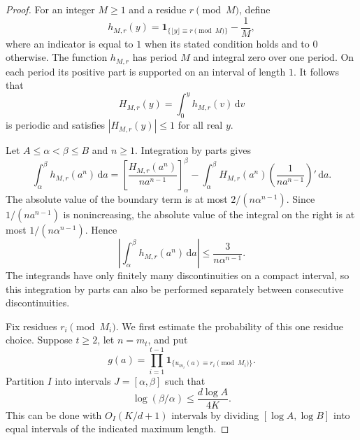 \documentclass[11pt,reqno]{amsart}
\numberwithin{equation}{section}
\begin{document}
\begin{proof}
For an integer $M\ge1$ and a residue $r\pmod M$, define
\[
 h_{M,r}(y)=\mathbf1_{\{\lfloor y\rfloor\equiv r\pmod M\}}-\frac1M,
\]
where an indicator is equal to $1$ when its stated condition holds and to $0$ otherwise. The function $h_{M,r}$ has period $M$ and integral zero over one period. On each period its positive part is supported on an interval of length $1$. It follows that
\[
 H_{M,r}(y)=\int_0^y h_{M,r}(v)\,\mathrm{d}v
\]
is periodic and satisfies $|H_{M,r}(y)|\le1$ for all real $y$.

Let $A\le \alpha<\beta\le B$ and $n\ge1$. Integration by parts gives
\[
 \int_\alpha^\beta h_{M,r}(a^n)\,\mathrm{d}a
 =\left[\frac{H_{M,r}(a^n)}{na^{n-1}}\right]_\alpha^\beta
  -\int_\alpha^\beta H_{M,r}(a^n)
       \left(\frac1{na^{n-1}}\right)'\,\mathrm{d}a.
\]
The absolute value of the boundary term is at most $2/(n\alpha^{n-1})$. Since $1/(na^{n-1})$ is nonincreasing, the absolute value of the integral on the right is at most $1/(n\alpha^{n-1})$. Hence
\begin{equation}\label{eq-prime-periodic-integral}
 \left|\int_\alpha^\beta h_{M,r}(a^n)\,\mathrm{d}a\right|
 \le\frac3{n\alpha^{n-1}}.
\end{equation}
The integrands have only finitely many discontinuities on a compact interval, so this integration by parts can also be performed separately between consecutive discontinuities.

Fix residues $r_i\pmod{M_i}$. We first estimate the probability of this one residue choice. Suppose $t\ge2$, let $n=m_t$, and put
\[
 g(a)=\prod_{i=1}^{t-1}
       \mathbf1_{\{u_{m_i}(a)\equiv r_i\pmod{M_i}\}}.
\]
Partition $I$ into intervals $J=[\alpha,\beta]$ such that
\[
 \log(\beta/\alpha)\le\frac{d\log A}{4K}.
\]
This can be done with $O_I(K/d+1)$ intervals by dividing $[\log A,\log B]$ into equal intervals of the indicated maximum length.


\end{proof}
\end{document}
